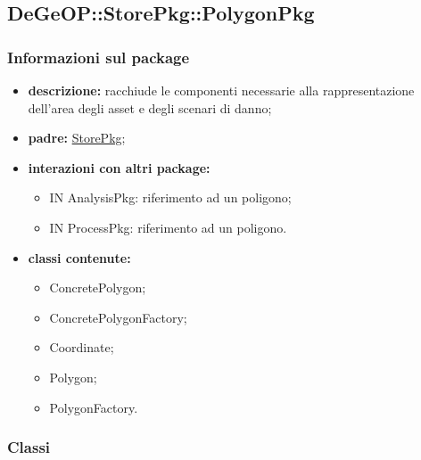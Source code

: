 \subsection{DeGeOP::StorePkg::PolygonPkg}
\label{pkg::PolygonPkg}
\subsubsection{Informazioni sul package}
\begin{itemize}
	\item \textbf{descrizione:} racchiude le componenti necessarie alla rappresentazione dell'area degli asset e degli scenari di danno;
	\item \textbf{padre:} \hyperref[pkg::StorePkg]{StorePkg};
	\item \textbf{interazioni con altri package:} 
	\begin{itemize}
		\item IN AnalysisPkg: riferimento ad un poligono;
		\item IN ProcessPkg: riferimento ad un poligono.
	\end{itemize}
	\item \textbf{classi contenute:}
	\begin{itemize}
		\item ConcretePolygon;
		\item ConcretePolygonFactory;
		\item Coordinate;
		\item Polygon;
		\item PolygonFactory.
	\end{itemize}
\end{itemize}
\subsubsection{Classi}
